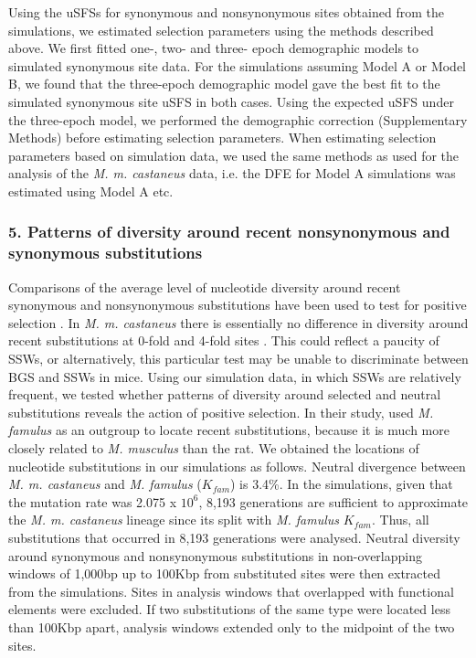 	Using the uSFSs for synonymous and nonsynonymous sites obtained from the simulations, we estimated selection parameters using the methods described above. We first fitted one-, two- and three- epoch demographic models to simulated synonymous site data. For the simulations assuming Model A or Model B, we found that the three-epoch demographic model gave the best fit to the simulated synonymous site uSFS in both cases. Using the expected uSFS under the three-epoch model, we performed the demographic correction (Supplementary Methods) before estimating selection parameters. When estimating selection parameters based on simulation data, we used the same methods as used for the analysis of the \textit{M. m. castaneus} data, i.e. the DFE for Model A simulations was estimated using Model A etc.

\subsubsection{5. Patterns of diversity around recent nonsynonymous and synonymous substitutions}

	Comparisons of the average level of nucleotide diversity around recent synonymous and nonsynonymous substitutions have been used to test for positive selection 
\citep{RN162,RN167,RN122,RN236,RN230}. In \textit{M. m. castaneus} there is essentially no difference in diversity around recent substitutions at 0-fold and 4-fold sites \citep{RN122}. This could reflect a paucity of SSWs, or alternatively, this particular test may be unable to discriminate between BGS and SSWs in mice. Using our simulation data, in which SSWs are relatively frequent, we tested whether patterns of diversity around selected and neutral substitutions reveals the action of positive selection. In their study, \cite{RN122} used \textit{M. famulus} as an outgroup to locate recent substitutions, because it is much more closely related to \textit{M. musculus} than the rat. We obtained the locations of nucleotide substitutions in our simulations as follows. Neutral divergence between \textit{M. m. castaneus} and \textit{M. famulus} ($K_{fam}$) is 3.4\%. In the simulations, given that the mutation rate was 2.075 x $10^6$, 8,193 generations are sufficient to approximate the \textit{M. m. castaneus} lineage since its split with \textit{M. famulus} $K_{fam}$. Thus, all substitutions that occurred in 8,193 generations were analysed. Neutral diversity around synonymous and nonsynonymous substitutions in non-overlapping windows of 1,000bp up to 100Kbp from substituted sites were then extracted from the simulations. Sites in analysis windows that overlapped with functional elements were excluded. If two substitutions of the same type were located less than 100Kbp apart, analysis windows extended only to the midpoint of the two sites.
 

